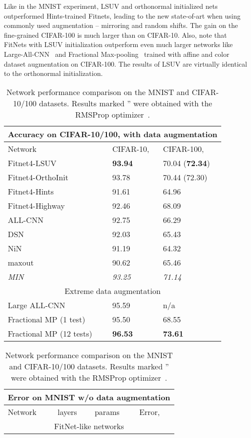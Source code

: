 \documentclass{article} \clearpage{}\usepackage{iclr2016_conference,times}
\begin{document}
Like in the MNIST experiment, LSUV and orthonormal initialized nets outperformed Hints-trained Fitnets, leading to the new state-of-art when using commonly used augmentation -- mirroring and random shifts. The gain on the fine-grained CIFAR-100 is much larger than on CIFAR-10. Also, note that FitNets with LSUV initialization outperform even much larger networks like Large-All-CNN~\cite{ALLCNN2015} and Fractional Max-pooling~\cite{FractMaxPool2014} trained with affine and color dataset augmentation on CIFAR-100. 
The results of LSUV are virtually identical to the orthonormal initialization. 
\begin{table}[htb]
\caption{Network performance comparison on the MNIST and CIFAR-10/100 datasets. Results marked '' were obtained with the RMSProp optimizer~\cite{Tieleman2012}.}
\label{tab:CIFAR-MNIST}
\footnotesize
\centering
\setlength{\tabcolsep}{.3em}
\begin{tabular}{lll}
\multicolumn{3}{c}{Accuracy on CIFAR-10/100, with data augmentation}\\
\hline
Network &CIFAR-10,  & CIFAR-100, \\
\hline
Fitnet4-LSUV & \textbf{93.94} & 70.04 (\textbf{72.34}) \\
Fitnet4-OrthoInit & 93.78          & 70.44 (72.30) \\
Fitnet4-Hints     & 91.61          & 64.96 \\
Fitnet4-Highway   & 92.46          & 68.09 \\
\hline
ALL-CNN &  92.75 & 66.29\\
DSN &  92.03 & 65.43\\
NiN &  91.19 & 64.32\\
maxout &  90.62 & 65.46\\
\textit{MIN} & \textit{93.25}& \textit{71.14} \\
\hline
\multicolumn{3}{c}{Extreme data augmentation}\\
\hline
Large ALL-CNN& 95.59 & n/a\\
Fractional MP (1 test) & 95.50 & 68.55 \\
Fractional MP (12 tests)& \textbf{96.53} & \textbf{73.61}\\
\hline
\end{tabular}
\begin{tabular}{llll}
\multicolumn{4}{c}{Error on MNIST w/o data augmentation}\\
\hline
Network &  layers &  params & Error, \\
\hline
\multicolumn{4}{c}{FitNet-like networks}\\

\end{tabular}
\end{table}
\end{document}
